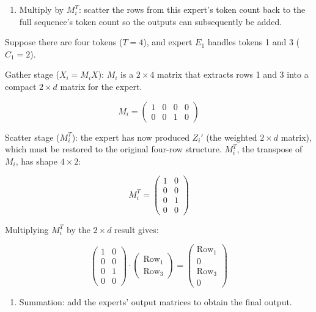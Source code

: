 \begin{enumerate}
\def\labelenumi{\arabic{enumi}.}
\setcounter{enumi}{2}
\tightlist
\item
  Multiply by \(M_i^T\): scatter the rows from this expert's token count back to the full sequence's token count so the outputs can subsequently be added.
\end{enumerate}

Suppose there are four tokens (\(T=4\)), and expert \(E_1\) handles tokens 1 and 3 (\(C_1=2\)).

Gather stage (\(X_i=M_iX\)): \(M_i\) is a \(2 \times 4\) matrix that extracts rows 1 and 3 into a compact \(2 \times d\) matrix for the expert.

\[
M_i =
\begin{pmatrix}
1 & 0 & 0 & 0 \\
0 & 0 & 1 & 0
\end{pmatrix}
\]

Scatter stage (\(M_i^T\)): the expert has now produced \(Z_i'\) (the weighted \(2 \times d\) matrix), which must be restored to the original four-row structure. \(M_i^T\), the transpose of \(M_i\), has shape \(4 \times 2\):

\[
M_i^T =
\begin{pmatrix}
1 & 0 \\
0 & 0 \\
0 & 1 \\
0 & 0
\end{pmatrix}
\]

Multiplying \(M_i^T\) by the \(2 \times d\) result gives:

\[
\begin{pmatrix}
1 & 0 \\
0 & 0 \\
0 & 1 \\
0 & 0
\end{pmatrix}
\cdot
\begin{pmatrix}
\mathrm{Row}_1 \\
\mathrm{Row}_3
\end{pmatrix}
=
\begin{pmatrix}
\mathrm{Row}_1 \\
0 \\
\mathrm{Row}_3 \\
0
\end{pmatrix}
\]

\begin{enumerate}
\def\labelenumi{\arabic{enumi}.}
\setcounter{enumi}{3}
\tightlist
\item
  Summation: add the experts' output matrices to obtain the final output.
\end{enumerate}


